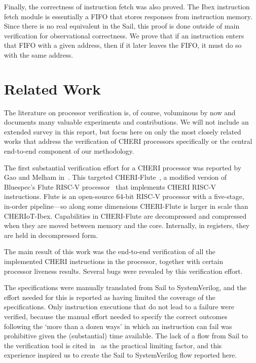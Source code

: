 \documentclass[10pt,conference]{IEEEtran}
\begin{document}
Finally, the correctness of instruction fetch was also proved. The Ibex
instruction fetch module is essentially a FIFO that stores responses from
instruction memory. Since there is no real equivalent in the Sail, this
proof is done outside of main verification for observational correctness. We
prove that if an instruction enters that FIFO with a given address, then if
it later leaves the FIFO, it must do so with the same address.

\section{Related Work}\label{sec:related}

The literature on processor verification is, of course, voluminous by now
and documents many valuable experiments and contributions. We will not
include an extended survey in this report, but focus here on only the most
closely related works that address the verification of CHERI processors
specifically or the central end-to-end component of our methodology.

The first substantial verification effort for a CHERI processor was
reported by Gao and Melham in~\cite{Gao:2021:EFV}. This targeted
CHERI-Flute~\cite{CTSRDCHERIFluteRISCV}, a modified version of Bluespec's
Flute RISC-V processor~\cite{Flute,FluteAnnouncement} that implements CHERI
RISC-V instructions. Flute is an open-source 64-bit RISC-V processor with a
five-stage, in-order pipeline---so along some dimensions CHERI-Flute is
larger in scale than CHERIoT-Ibex. Capabilities in CHERI-Flute are
decompressed and compressed when they are moved between memory and the
core. Internally, in registers, they are held in decompressed form.

The main result of this work was the end-to-end verification of all the
implemented CHERI instructions in the processor, together with certain
processor liveness results.  Several bugs were revealed by this
verification effort.

The specifications were manually translated from Sail to SystemVerilog, and
the effort needed for this is reported as having limited the coverage of
the specifications. Only instruction executions that do not lead to a
failure were verified, because the manual effort needed to specify the
correct outcomes following the `more than a dozen ways' in which an
instruction can fail was prohibitive given the (substantial) time available.
The lack of a flow from Sail to the verification tool is cited
in~\cite{Gao:2021:EFV} as the practical limiting factor, and this
experience inspired us to create the Sail to SystemVerilog flow reported
here.
\end{document}
